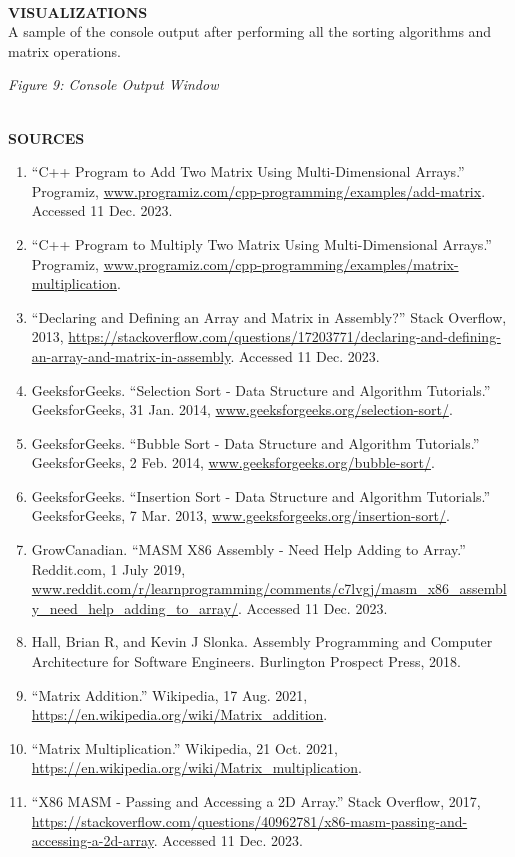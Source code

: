 \documentclass[twoside]{article}
\begin{document}
\noindent \\ \textbf{VISUALIZATIONS}
\\A sample of the console output after performing all the sorting algorithms and matrix operations.
\begin{center}\textit{Figure 9: Console Output Window}\end{center}


\newpage
\noindent \\ \textbf{SOURCES}
\begin{enumerate}
\item “C++ Program to Add Two Matrix Using Multi-Dimensional Arrays.” Programiz, \url{www.programiz.com/cpp-programming/examples/add-matrix}. Accessed 11 Dec. 2023.
\item “C++ Program to Multiply Two Matrix Using Multi-Dimensional Arrays.” Programiz, \url{www.programiz.com/cpp-programming/examples/matrix-multiplication}.
\item “Declaring and Defining an Array and Matrix in Assembly?” Stack Overflow, 2013, \url{https://stackoverflow.com/questions/17203771/declaring-and-defining-an-array-and-matrix-in-assembly}. Accessed 11 Dec. 2023.
\item GeeksforGeeks. “Selection Sort - Data Structure and Algorithm Tutorials.” GeeksforGeeks, 31 Jan. 2014, \url{www.geeksforgeeks.org/selection-sort/}.
\item GeeksforGeeks. “Bubble Sort - Data Structure and Algorithm Tutorials.” GeeksforGeeks, 2 Feb. 2014, \url{www.geeksforgeeks.org/bubble-sort/}.
\item GeeksforGeeks. “Insertion Sort - Data Structure and Algorithm Tutorials.” GeeksforGeeks, 7 Mar. 2013, \url{www.geeksforgeeks.org/insertion-sort/}.
\item GrowCanadian. “MASM X86 Assembly - Need Help Adding to Array.” Reddit.com, 1 July 2019, \url{www.reddit.com/r/learnprogramming/comments/c7lvgj/masm_x86_assembly_need_help_adding_to_array/}. Accessed 11 Dec. 2023.
\item Hall, Brian R, and Kevin J Slonka. Assembly Programming and Computer Architecture for Software Engineers. Burlington Prospect Press, 2018.
\item “Matrix Addition.” Wikipedia, 17 Aug. 2021, \url{https://en.wikipedia.org/wiki/Matrix_addition}.
\item “Matrix Multiplication.” Wikipedia, 21 Oct. 2021, \url{https://en.wikipedia.org/wiki/Matrix_multiplication}.
\item “X86 MASM - Passing and Accessing a 2D Array.” Stack Overflow, 2017, \url{https://stackoverflow.com/questions/40962781/x86-masm-passing-and-accessing-a-2d-array}. Accessed 11 Dec. 2023.
\end{enumerate}
\end{document}
